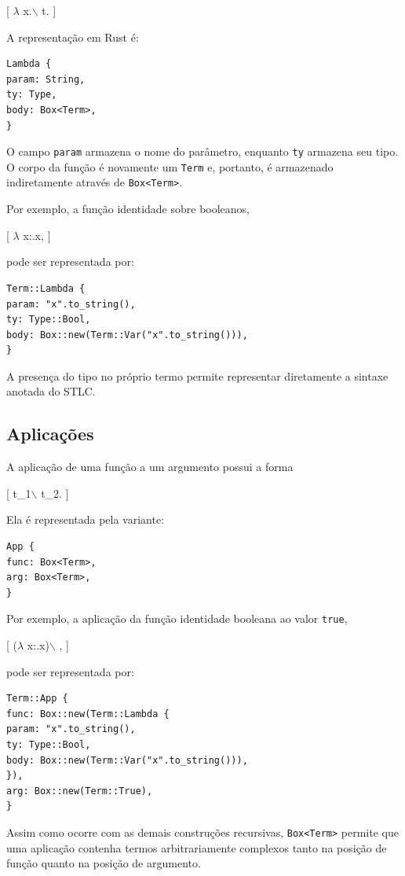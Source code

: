 \documentclass[11pt]{article}
\begin{document}
{[}
\(\lambda\) x.$\backslash$ t.
]

A representação em Rust é:

\begin{verbatim}
Lambda {
param: String,
ty: Type,
body: Box<Term>,
}
\end{verbatim}

O campo \texttt{param} armazena o nome do parâmetro, enquanto \texttt{ty} armazena seu
tipo. O corpo da função é novamente um \texttt{Term} e, portanto, é armazenado
indiretamente através de \texttt{Box<Term>}.

Por exemplo, a função identidade sobre booleanos,

{[}
\(\lambda\) x:.x,
]

pode ser representada por:

\begin{verbatim}
Term::Lambda {
param: "x".to_string(),
ty: Type::Bool,
body: Box::new(Term::Var("x".to_string())),
}
\end{verbatim}

A presença do tipo no próprio termo permite representar diretamente a
sintaxe anotada do STLC.
\subsection{Aplicações}
\label{sec:orgeb4ea92}

A aplicação de uma função a um argumento possui a forma

{[}
t\_1$\backslash$ t\_2.
]

Ela é representada pela variante:

\begin{verbatim}
App {
func: Box<Term>,
arg: Box<Term>,
}
\end{verbatim}

Por exemplo, a aplicação da função identidade booleana ao valor \texttt{true},

{[}
(\(\lambda\) x:.x)$\backslash$ ,
]

pode ser representada por:

\begin{verbatim}
Term::App {
func: Box::new(Term::Lambda {
param: "x".to_string(),
ty: Type::Bool,
body: Box::new(Term::Var("x".to_string())),
}),
arg: Box::new(Term::True),
}
\end{verbatim}

Assim como ocorre com as demais construções recursivas, \texttt{Box<Term>} permite
que uma aplicação contenha termos arbitrariamente complexos tanto na posição
de função quanto na posição de argumento.
\end{document}
